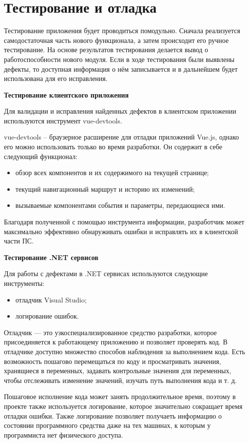 \section{Тестирование и отладка}\label{sec:manual}

Тестирование приложения будет проводиться помодульно. Сначала реализуется самодостаточная часть нового функционала, а затем происходит его ручное тестирование. На основе результатов тестирования делается вывод о работоспособности нового модуля. Если в ходе тестирования были выявлены дефекты, то доступная информация о нём записывается и в дальнейшем будет использована для его исправления.

\bigskip
\textbf{Тестирование клиентского приложения}

Для валидации и исправления найденных дефектов в клиентском приложении используются инструмент vue-devtools.

vue-devtools – браузерное расширение для отладки приложений Vue.js, однако его можно использовать только во время разработки. Он содержит в себе следующий функционал:
\begin{itemize}
    \item обзор всех компонентов и их содержимого на текущей странице;
    \item текущий навигационный маршрут и историю их изменений;
    \item вызываемые компонентами события и параметры, передающиеся ими.
\end{itemize}

Благодаря полученной с помощью инструмента информации, разработчик может максимально эффективно обнаруживать ошибки и исправлять их в клиентской части ПС.

\bigskip
\textbf{Тестирование .NET сервисов}

Для работы с дефектами в .NET сервисах используются следующие инструменты:
\begin{itemize}
    \item отладчик Visual Studio;
    \item логирование ошибок.
\end{itemize}

Отладчик — это узкоспециализированное средство разработки, которое присоединяется к работающему приложению и позволяет проверять код. В отладчике доступно множество способов наблюдения за выполнением кода. Есть возможность пошагово перемещаться по коду и просматривать значения, хранящиеся в переменных, задавать контрольные значения для переменных, чтобы отслеживать изменение значений, изучать путь выполнения кода и т. д.

Пошаговое исполнение кода может занять продолжительное время, поэтому в проекте также используется логирование, которое значительно сокращает время отладки ошибки. Также логирование позволяет получаеть информацию о состоянии программного средства даже на тех машинах, к которым у программиста нет физического доступа.
